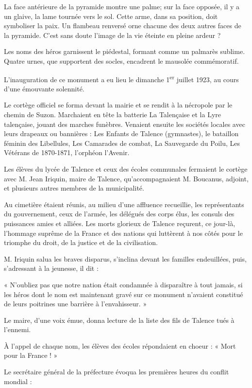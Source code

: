 \documentclass[a4paper,11pt]{book}
\begin{document}
La face antérieure de la pyramide montre une palme; sur la face opposée, il y a un glaive, la lame tournée vers le sol. Cette arme, dans sa position, doit symboliser la paix. Un flambeau renversé orne chacune des deux autres faces de la pyramide. C'est sans doute l'image de la vie éteinte en pleine ardeur ?

Les noms des héros garnissent le piédestal, formant comme un palmarès sublime. Quatre urnes, que supportent des socles, encadrent le mausolée commémoratif.

L'inauguration de ce monument a eu lieu le dimanche 1\textsuperscript{er} juillet 1923, au cours d'une émouvante solennité.

Le cortège officiel se forma devant la mairie et se rendit à la nécropole par le chemin de Suzon. Marchaient en tête la batterie La Talençaise et la Lyre talençaise, jouant des marches funèbres. Venaient ensuite les sociétés locales avec leurs drapeaux ou bannières : Les Enfants de Talence (gymnastes), le bataillon féminin des Libellules, Les Camarades de combat, La Sauvegarde du Poilu, Les Vétérans de 1870-1871, l'orphéon l'Avenir.

Les élèves du lycée de Talence et ceux des écoles communales fermaient le cortège avec M. Jean Iriquin, maire de Talence, qu'accompagnaient M. Boucanus, adjoint, et plusieurs autres membres de la municipalité.

Au cimetière étaient réunis, au milieu d'une affluence recueillie, les représentants du gouvernement, ceux de l'armée, les délégués des corps élus, les consuls des puissances amies et alliées. Les morts glorieux de Talence reçurent, ce jour-là, l'hommage suprême de la France et des nations qui luttèrent à nos côtés pour le triomphe du droit, de la justice et de la civilisation.

M. Iriquin salua les braves disparus, s'inclina devant les familles endeuillées, puis, s'adressant à la jeunesse, il dit :

« N'oubliez pas que notre nation était condamnée à disparaître à tout jamais, si les héros dont le nom est maintenant gravé sur ce monument n'avaient constitué de leurs poitrines une barrière à l'envahisseur. »

Le maire, d'une voix émue, donna lecture de la liste des fils de Talence tués à l'ennemi.

À l'appel de chaque nom, les élèves des écoles répondaient en choeur : « Mort pour la France ! »

Le secrétaire général de la préfecture évoqua les premières heures du conflit mondial :
\end{document}
